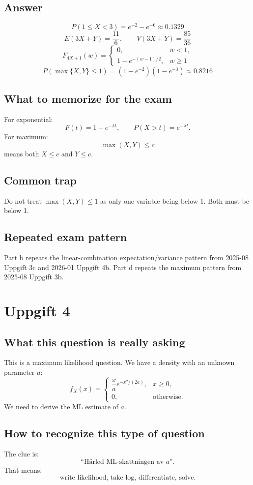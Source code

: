 \documentclass[11pt,a4paper]{article}
\begin{document}
\subsection*{Answer}
\[
\boxed{P(1\le X<3)=e^{-2}-e^{-6}\approx 0.1329}
\]
\[
\boxed{E(3X+Y)=\frac{11}{6}},\qquad
\boxed{V(3X+Y)=\frac{85}{36}}
\]
\[
\boxed{
F_{4X+1}(w)=
\begin{cases}
0, & w<1,\\
1-e^{-(w-1)/2}, & w\ge 1
\end{cases}}
\]
\[
\boxed{P(\max\{X,Y\}\le 1)=(1-e^{-2})(1-e^{-3})\approx 0.8216}
\]

\subsection*{What to memorize for the exam}
For exponential:
\[
F(t)=1-e^{-\lambda t},\qquad P(X>t)=e^{-\lambda t}.
\]
For maximum:
\[
\max(X,Y)\le c
\]
means both \(X\le c\) and \(Y\le c\).

\subsection*{Common trap}
Do not treat \(\max(X,Y)\le 1\) as only one variable being below 1. Both must be below 1.

\subsection*{Repeated exam pattern}
Part b repeats the linear-combination expectation/variance pattern from 2025-08 Uppgift 3c and 2026-01 Uppgift 4b. Part d repeats the maximum pattern from 2025-08 Uppgift 3b.

\section*{Uppgift 4}

\subsection*{What this question is really asking}
This is a maximum likelihood question. We have a density with an unknown parameter \(a\):
\[
f_X(x)=
\begin{cases}
\dfrac{x}{a}e^{-x^2/(2a)}, & x\ge 0,\\
0, & \text{otherwise}.
\end{cases}
\]
We need to derive the ML estimate of \(a\).

\subsection*{How to recognize this type of question}
The clue is:
\[
\text{``Härled ML-skattningen av \(a\)''}.
\]
That means:
\[
\text{write likelihood, take log, differentiate, solve.}
\]
\end{document}
